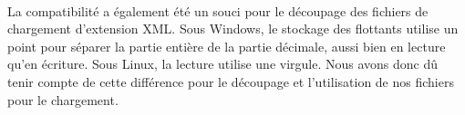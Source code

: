 \paragraph{}
La compatibilité a également été un souci pour le découpage des fichiers de chargement d'extension XML. Sous Windows, le stockage des flottants utilise un point pour séparer la partie entière de la partie décimale, aussi bien en lecture qu'en écriture. Sous Linux, la lecture utilise une virgule. Nous avons donc dû tenir compte de cette différence pour le découpage et l'utilisation de nos fichiers pour le chargement.
